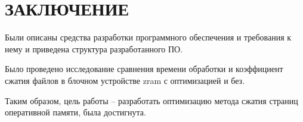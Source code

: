 \section*{ЗАКЛЮЧЕНИЕ}

Были описаны средства разработки программного обеспечения и требования к нему и приведена структура разрабо­танного ПО.

Было проведено исследование сравнения времени обработки и коэффициент сжатия файлов в блочном устройстве zram с оптимизацией и без. 

Таким образом, цель работы -- разработать оптимизацию метода сжатия страниц оперативной памяти, была достигнута.

\pagebreak